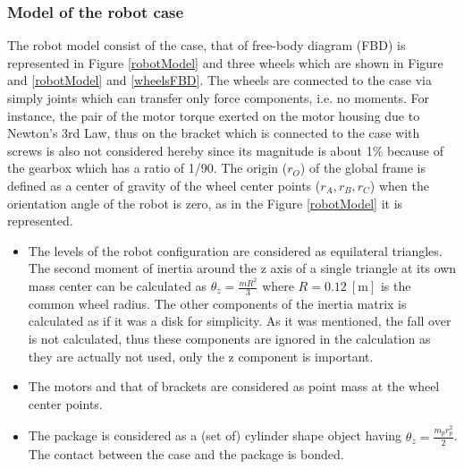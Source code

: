\documentclass[12pt,english]{article}
\begin{document}
\subsubsection{Model of the robot case}
The robot model consist of the case, that of free-body diagram (FBD) is represented in Figure \ref{robotModel} and three wheels which are shown in Figure and \ref{robotModel} and \ref{wheelsFBD}. The wheels are connected to the case via simply joints which can transfer only force components, i.e. no moments. For instance, the pair of the motor torque exerted on the motor housing due to Newton's 3rd Law, thus on the bracket which is connected to the case with screws is also not considered hereby since its magnitude is about 1\% because of the gearbox which has a ratio of 1/90. The origin ($r_O$) of the global frame is defined as a center of gravity of the wheel center points ($r_A,r_B,r_C$) when the orientation angle of the robot is zero, as in the Figure \ref{robotModel} it is represented.
\begin{itemize}
	\item The levels of the robot configuration are considered as equilateral triangles. The second moment of inertia around the z axis of a single triangle at its own mass center can be calculated as $\theta_z=\frac{m R^2}{3}$ where $R=0.12~\left[\text{m}\right]$ is the common wheel radius. The other components of the inertia matrix is calculated as if it was a disk for simplicity. As it was mentioned, the fall over is not calculated, thus these components are ignored in the calculation as they are actually not used, only the z component is important.
	\item The motors and that of brackets are considered as point mass at the wheel center points.
	\item The package is considered as a (set of) cylinder shape object having $\theta_z=\frac{m_p r_p^2}{2}$. The contact between the case and the package is bonded.
\end{itemize}
\end{document}
